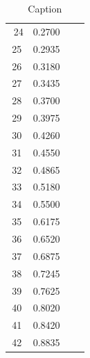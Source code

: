 \documentclass[12pt, a4paper]{article}
\begin{document}
\begin{table}[h!]
{\begin{tabular}{|c|c|c|c|}
$$         \footnotesize 24 & \footnotesize0.2700& & \\
         \footnotesize 25 & \footnotesize0.2935& & \\
         \footnotesize 26 & \footnotesize0.3180& & \\
         \footnotesize 27 & \footnotesize0.3435& & \\
         \footnotesize 28 & \footnotesize0.3700& & \\
         \footnotesize 29 & \footnotesize0.3975& & \\
         \footnotesize 30 & \footnotesize0.4260& & \\
         \footnotesize 31 & \footnotesize0.4550& & \\ 
         \footnotesize 32 & \footnotesize0.4865& & \\
         \footnotesize 33 & \footnotesize0.5180& & \\
         \footnotesize 34 & \footnotesize0.5500& & \\
         \footnotesize 35 & \footnotesize0.6175& & \\
         \footnotesize 36 & \footnotesize0.6520& & \\
         \footnotesize 37 & \footnotesize0.6875& & \\
         \footnotesize 38 & \footnotesize0.7245& & \\
         \footnotesize 39 & \footnotesize0.7625& & \\
         \footnotesize 40 & \footnotesize0.8020& & \\
         \footnotesize 41 & \footnotesize0.8420& & \\
         \footnotesize 42 &\footnotesize 0.8835& & \\
    \hline
         
    \end{tabular}}
    \caption{Caption}
    \label{Tabella Completa}
\end{table}
\end{document}
